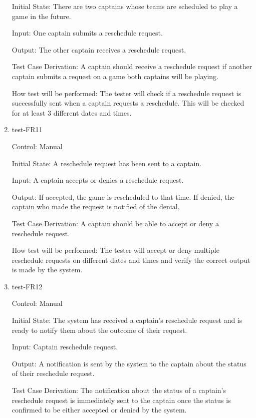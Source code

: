 \documentclass[12pt, titlepage]{article}
\begin{document}
\begin{enumerate}
  Initial State: There are two captains whose teams are scheduled to play a
  game in the future.
            
  Input: One captain submits a reschedule request.

  Output: The other captain receives a reschedule request.

  Test Case Derivation: A captain should receive a reschedule request if another
  captain submits a request on a game both captains will be playing.

  How test will be performed: The tester will check if a reschedule request is
  successfully sent when a captain requests a reschedule. This will be checked
  for at least 3 different dates and times.

  \item{test-FR11\\}

  Control: Manual

  Initial State: A reschedule request has been sent to a captain.
            
  Input: A captain accepts or denies a reschedule request.

  Output: If accepted, the game is rescheduled to that time. If denied, the
  captain who made the request is notified of the denial.

  Test Case Derivation: A captain should be able to accept or deny a reschedule
  request.

  How test will be performed: The tester will accept or deny multiple reschedule
  requests on different dates and times and verify the correct output is made by
  the system.

  \item{test-FR12\\}

  Control: Manual
            
  Initial State: The system has received a captain's reschedule request and is ready to
  notify them about the outcome of their request.
            
  Input: Captain reschedule request.
            
  Output: A notification is sent by the system to the captain about the status of their
  reschedule request.

  Test Case Derivation: The notification about the status of a captain's reschedule
  request is immediately sent to the captain once the status is confirmed to be either
  accepted or denied by the system.
            

\end{enumerate}
\end{document}
